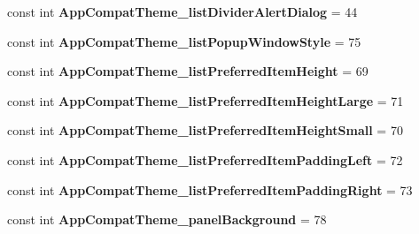 \begin{DoxyCompactItemize}
\mbox{\label{class_pinned_app_1_1_droid_1_1_resource_1_1_styleable_a1ed9d03fe6743a84926000b1b1943d96}} 
const int {\bfseries App\+Compat\+Theme\+\_\+list\+Divider\+Alert\+Dialog} = 44
\item 
\mbox{\label{class_pinned_app_1_1_droid_1_1_resource_1_1_styleable_a6f611fa8109e8529dd1e0f827825f393}} 
const int {\bfseries App\+Compat\+Theme\+\_\+list\+Popup\+Window\+Style} = 75
\item 
\mbox{\label{class_pinned_app_1_1_droid_1_1_resource_1_1_styleable_ade7b06152734f5d4ab967298b9f70133}} 
const int {\bfseries App\+Compat\+Theme\+\_\+list\+Preferred\+Item\+Height} = 69
\item 
\mbox{\label{class_pinned_app_1_1_droid_1_1_resource_1_1_styleable_a88d31b57cf18e274542ec36ab4426d58}} 
const int {\bfseries App\+Compat\+Theme\+\_\+list\+Preferred\+Item\+Height\+Large} = 71
\item 
\mbox{\label{class_pinned_app_1_1_droid_1_1_resource_1_1_styleable_a26ba25f9fb0e54a13ff8f04907be0f05}} 
const int {\bfseries App\+Compat\+Theme\+\_\+list\+Preferred\+Item\+Height\+Small} = 70
\item 
\mbox{\label{class_pinned_app_1_1_droid_1_1_resource_1_1_styleable_a4d58d844e75c8d6cb7bcee811d725925}} 
const int {\bfseries App\+Compat\+Theme\+\_\+list\+Preferred\+Item\+Padding\+Left} = 72
\item 
\mbox{\label{class_pinned_app_1_1_droid_1_1_resource_1_1_styleable_a7643285246e65039fe299afea3d884ba}} 
const int {\bfseries App\+Compat\+Theme\+\_\+list\+Preferred\+Item\+Padding\+Right} = 73
\item 
\mbox{\label{class_pinned_app_1_1_droid_1_1_resource_1_1_styleable_aa5cbc48afe2ade5f71ada0282b18fdb0}} 
const int {\bfseries App\+Compat\+Theme\+\_\+panel\+Background} = 78

\end{DoxyCompactItemize}
